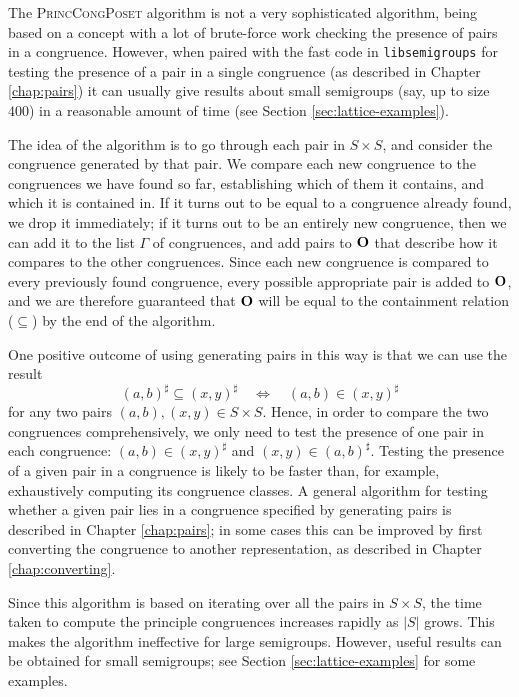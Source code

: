 The \textsc{PrincCongPoset} algorithm is not a very sophisticated algorithm,
being based on a concept with a lot of brute-force work checking the presence of
pairs in a congruence.  However, when paired with the fast code in
\texttt{libsemigroups} \cite{libsemigroups} for testing the presence of a pair
in a single congruence (as described in Chapter \ref{chap:pairs}) it can usually
give results about small semigroups (say, up to size $400$) in a reasonable
amount of time (see Section \ref{sec:lattice-examples}).

The idea of the algorithm is to go through each pair in $S \times S$, and
consider the congruence generated by that pair.  We compare each new congruence
to the congruences we have found so far, establishing which of them it contains,
and which it is contained in.  If it turns out to be equal to a congruence
already found, we drop it immediately; if it turns out to be an entirely new
congruence, then we can add it to the list $\Gamma$ of congruences, and add
pairs to $\mathbf{O}$ that describe how it compares to the other congruences.  Since
each new congruence is compared to every previously found congruence, every
possible appropriate pair is added to $\mathbf{O}$, and we are therefore guaranteed
that $\mathbf{O}$ will be equal to the containment relation ($\subseteq$) by the end of
the algorithm.

One positive outcome of using generating pairs in this way is that we can use
the result
$$(a,b)^\sharp \subseteq (x,y)^\sharp \quad\iff\quad (a,b) \in (x,y)^\sharp$$
for any two pairs $(a,b), (x,y) \in S \times S$.  Hence, in order to compare the
two congruences comprehensively, we only need to test the presence of one pair
in each congruence: $(a,b) \in (x,y)^\sharp$ and $(x,y) \in (a,b)^\sharp$.
Testing the presence of a given pair in a congruence is likely to be faster
than, for example, exhaustively computing its congruence classes.  A general
algorithm for testing whether a given pair lies in a congruence specified by
generating pairs is described in Chapter \ref{chap:pairs}; in some cases this
can be improved by first converting the congruence to another representation, as
described in Chapter \ref{chap:converting}.

Since this algorithm is based on iterating over all the pairs in $S \times S$,
the time taken to compute the principle congruences increases rapidly as $|S|$
grows.  This makes the algorithm ineffective for large semigroups.  However,
useful results can be obtained for small semigroups; see Section
\ref{sec:lattice-examples} for some examples.

